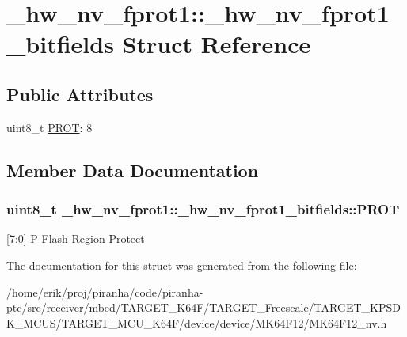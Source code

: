 \hypertarget{struct__hw__nv__fprot1_1_1__hw__nv__fprot1__bitfields}{}\section{\+\_\+hw\+\_\+nv\+\_\+fprot1\+:\+:\+\_\+hw\+\_\+nv\+\_\+fprot1\+\_\+bitfields Struct Reference}
\label{struct__hw__nv__fprot1_1_1__hw__nv__fprot1__bitfields}
\subsection*{Public Attributes}
\begin{DoxyCompactItemize}
\item 
uint8\+\_\+t \hyperlink{struct__hw__nv__fprot1_1_1__hw__nv__fprot1__bitfields_a49001732847572ea9c745652147f9fb1}{P\+R\+OT}\+: 8
\end{DoxyCompactItemize}


\subsection{Member Data Documentation}
\subsubsection[{\texorpdfstring{P\+R\+OT}{PROT}}]{\setlength{\rightskip}{0pt plus 5cm}uint8\+\_\+t \+\_\+hw\+\_\+nv\+\_\+fprot1\+::\+\_\+hw\+\_\+nv\+\_\+fprot1\+\_\+bitfields\+::\+P\+R\+OT}\hypertarget{struct__hw__nv__fprot1_1_1__hw__nv__fprot1__bitfields_a49001732847572ea9c745652147f9fb1}{}\label{struct__hw__nv__fprot1_1_1__hw__nv__fprot1__bitfields_a49001732847572ea9c745652147f9fb1}
\mbox{[}7\+:0\mbox{]} P-\/\+Flash Region Protect 

The documentation for this struct was generated from the following file\+:\begin{DoxyCompactItemize}
\item 
/home/erik/proj/piranha/code/piranha-\/ptc/src/receiver/mbed/\+T\+A\+R\+G\+E\+T\+\_\+\+K64\+F/\+T\+A\+R\+G\+E\+T\+\_\+\+Freescale/\+T\+A\+R\+G\+E\+T\+\_\+\+K\+P\+S\+D\+K\+\_\+\+M\+C\+U\+S/\+T\+A\+R\+G\+E\+T\+\_\+\+M\+C\+U\+\_\+\+K64\+F/device/device/\+M\+K64\+F12/M\+K64\+F12\+\_\+nv.\+h\end{DoxyCompactItemize}
